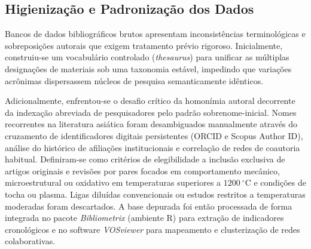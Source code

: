 \subsection{Higienização e Padronização dos Dados}\label{sec:elegibilidade_processamento}

Bancos de dados bibliográficos brutos apresentam inconsistências terminológicas e sobreposições autorais que exigem tratamento prévio rigoroso. Inicialmente, construiu-se um vocabulário controlado (\emph{thesaurus}) para unificar as múltiplas designações de materiais sob uma taxonomia estável, impedindo que variações acrônimas dispersassem núcleos de pesquisa semanticamente idênticos. 

Adicionalmente, enfrentou-se o desafio crítico da homonímia autoral decorrente da indexação abreviada de pesquisadores pelo padrão sobrenome-inicial. Nomes recorrentes na literatura asiática foram desambiguados manualmente através do cruzamento de identificadores digitais persistentes (ORCID e Scopus Author ID), análise do histórico de afiliações institucionais e correlação de redes de coautoria habitual. Definiram-se como critérios de elegibilidade a inclusão exclusiva de artigos originais e revisões por pares focados em comportamento mecânico, microestrutural ou oxidativo em temperaturas superiores a $1200~^\circ\mathrm{C}$ e condições de tocha ou plasma. Ligas diluídas convencionais ou estudos restritos a temperaturas moderadas foram descartados. A base depurada foi então processada de forma integrada no pacote \emph{Bibliometrix} (ambiente R) para extração de indicadores cronológicos e no software \emph{VOSviewer} para mapeamento e clusterização de redes colaborativas.
